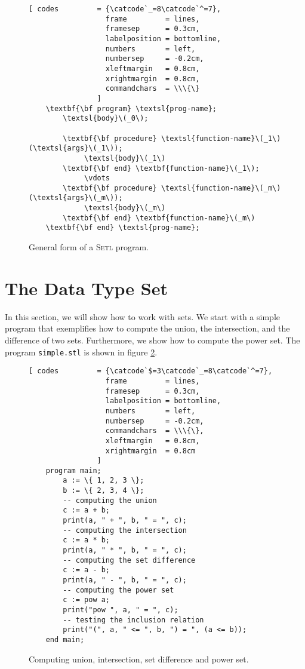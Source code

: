 \begin{figure}[!ht]
  \centering
\begin{Verbatim}[ codes         = {\catcode`_=8\catcode`^=7},
                  frame         = lines, 
                  framesep      = 0.3cm, 
                  labelposition = bottomline,
                  numbers       = left,
                  numbersep     = -0.2cm,
                  xleftmargin   = 0.8cm,
                  xrightmargin  = 0.8cm,
                  commandchars  = \\\{\}
                ]
    \textbf{\bf program} \textsl{prog-name};
        \textsl{body}\(_0\);
        
        \textbf{\bf procedure} \textsl{function-name}\(_1\)(\textsl{args}\(_1\));
             \textsl{body}\(_1\)
        \textbf{\bf end} \textbf{function-name}\(_1\);
             \vdots
        \textbf{\bf procedure} \textsl{function-name}\(_m\)(\textsl{args}\(_m\));
             \textsl{body}\(_m\)
        \textbf{\bf end} \textbf{function-name}\(_m\)
    \textbf{\bf end} \textsl{prog-name};
\end{Verbatim}
\vspace*{-0.3cm}
  \caption{General form of a \textsc{Setl} program.}
  \label{fig:general}
\end{figure} %

\section{The Data Type Set}
In this section, we will show how to work with sets.  We start with a simple program that
exemplifies how to compute the union, the intersection, and the difference of two sets.
Furthermore, we show how to compute the power set.
The program \texttt{simple.stl} is shown in figure \ref{fig:simple.stl}.

\begin{figure}[!ht]
  \centering
\begin{Verbatim}[ codes         = {\catcode`$=3\catcode`_=8\catcode`^=7},
                  frame         = lines, 
                  framesep      = 0.3cm, 
                  labelposition = bottomline,
                  numbers       = left,
                  numbersep     = -0.2cm,
                  commandchars  = \\\{\},
                  xleftmargin   = 0.8cm,
                  xrightmargin  = 0.8cm
                ]
    program main;
        a := \{ 1, 2, 3 \};
        b := \{ 2, 3, 4 \};
        -- computing the union 
        c := a + b;
        print(a, " + ", b, " = ", c);
        -- computing the intersection 
        c := a * b;
        print(a, " * ", b, " = ", c);
        -- computing the set difference 
        c := a - b;
        print(a, " - ", b, " = ", c);
        -- computing the power set
        c := pow a;
        print("pow ", a, " = ", c);
        -- testing the inclusion relation 
        print("(", a, " <= ", b, ") = ", (a <= b)); 
    end main;
\end{Verbatim} 
\vspace*{-0.3cm}
\caption{Computing union, intersection, set difference and power set.}
  \label{fig:simple.stl}
\end{figure} %

